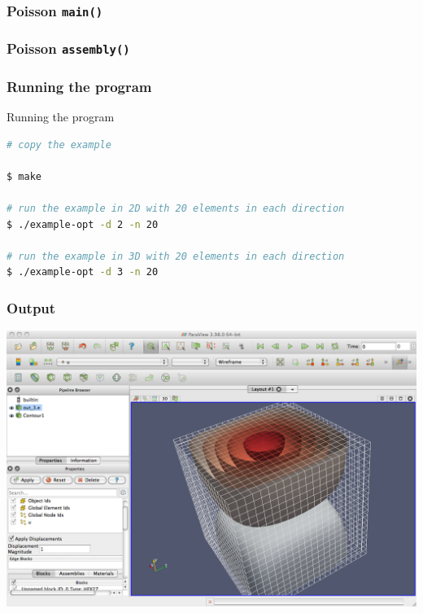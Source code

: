 \begin{frame}[allowframebreaks]
  \frametitle{Poisson \texttt{main()}}
  
\end{frame}


\begin{frame}[allowframebreaks]
  \frametitle{Poisson \texttt{assembly()}}
  
\end{frame}


\begin{frame}[fragile]
  \frametitle{Running the program}
    \begin{block}{Running the program}
    \begin{lstlisting}[language=bash]
# copy the example

$ make

# run the example in 2D with 20 elements in each direction
$ ./example-opt -d 2 -n 20 

# run the example in 3D with 20 elements in each direction
$ ./example-opt -d 3 -n 20 
    \end{lstlisting}
  \end{block}
\end{frame}

\frame
{
  \frametitle{Output}
  \begin{center}
    \includegraphics[height=0.8\textheight]{tutorial/poisson_ex1/screen}
  \end{center}
} 

\frame
{
  \Large
  \begin{block}{}
  \end{block}
}




